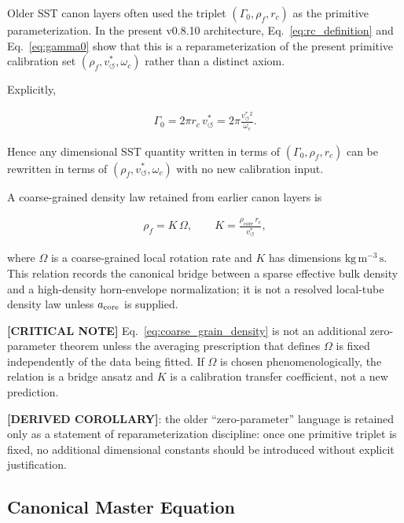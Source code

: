 \documentclass[11pt]{article}
\theoremstyle{definition}
\theoremstyle{plain}
\theoremstyle{remark}
\newcommand{\rhoF}{{\rho_{\!f}}}
\newcommand{\rhocore}{\rho_{\mathrm{core}}}
\newcommand{\rc}{{r_c}}
\newcommand{\vchar}{v_{\!\boldsymbol{\circlearrowleft}}^{\ast}}
\begin{document}
        Older SST canon layers often used the triplet $(\Gamma_0,\rhoF,\rc)$ as the primitive parameterization. In the present v0.8.10 architecture, Eq.~\eqref{eq:rc_definition} and Eq.~\eqref{eq:gamma0} show that this is a reparameterization of the present primitive calibration set $(\rhoF,\vchar,\omega_c)$ rather than a distinct axiom.

        Explicitly,

        \begin{align}
            \Gamma_0 = 2\pi \rc \, \vchar
            = 2\pi \frac{\vchar{}^2}{\omega_c}.
            \label{eq:gamma0_reparam}
        \end{align}

        Hence any dimensional SST quantity written in terms of $(\Gamma_0,\rhoF,\rc)$ can be rewritten in terms of $(\rhoF,\vchar,\omega_c)$ with no new calibration input.

        A coarse-grained density law retained from earlier canon layers is

        \begin{align}
            \rhoF = K\,\Omega,
            \qquad
            K = \frac{\rhocore \, \rc}{\vchar},
            \label{eq:coarse_grain_density}
        \end{align}

        where $\Omega$ is a coarse-grained local rotation rate and $K$ has dimensions $\mathrm{kg\,m^{-3}\,s}$. This relation records the canonical bridge between a sparse effective bulk density and a high-density horn-envelope normalization; it is not a resolved local-tube density law unless $a_{\rm core}$ is supplied.

        \textbf{[CRITICAL NOTE]} Eq.~\eqref{eq:coarse_grain_density} is not an additional zero-parameter theorem unless the averaging prescription that defines $\Omega$ is fixed independently of the data being fitted. If $\Omega$ is chosen phenomenologically, the relation is a bridge ansatz and $K$ is a calibration transfer coefficient, not a new prediction.

        \textbf{[DERIVED COROLLARY]}: the older ``zero-parameter'' language is retained only as a statement of reparameterization discipline: once one primitive triplet is fixed, no additional dimensional constants should be introduced without explicit justification.

    \subsection{Canonical Master Equation}
    \label{sec:master-equation}
\end{document}
